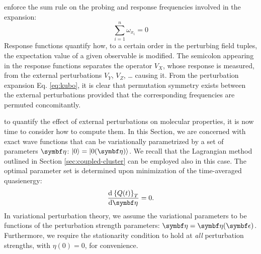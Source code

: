 enforce the sum rule on the probing and response frequencies involved in
the expansion:
\begin{equation}\label{eq:sum-rule}
 \sum_{i=1}^{n} \omega_{x_i} = 0
\end{equation}
Response functions quantify how, to a certain order in the perturbing
field tuples, the expectation value of a given observable is modified.
The semicolon appearing in the response functions separates the operator
$V_X$, whose response is measured, from the external perturbations
$V_Y$, $V_Z$, \dots{} causing it.
From the perturbation expansion Eq. \eqref{eq:kubo}, it is clear that
permutation symmetry exists between the external perturbations provided
that the corresponding frequencies are permuted concomitantly.

 to quantify the
effect of external perturbations on molecular properties, it is now time
to consider how to compute them.
In this Section, we are concerned with exact wave functions that can
be variationally parametrized by a set of parameters
$\vect{\eta}$: $\ket{0}=\ket{0(\vect{\eta})}$.
We recall that the Lagrangian method outlined in Section
\ref{sec:coupled-cluster} can be employed also in this
case.\autocite{Christiansen1998-pe, Helgaker2012-cz, Pawlowski2015-sq}
The optimal parameter set is determined upon minimization of the
time-averaged quasienergy:
\begin{equation}\label{eq:var-cond}
 \deriv{\aveQ}{\vect{\eta}} = 0.
\end{equation}
In variational perturbation theory,\autocite{Helgaker1992-ph,
Saue2002-ns} we assume the variational parameters to be functions of the
perturbation strength parameters: $\vect{\eta} =
\vect{\eta}(\vect{\epsilon})$.
Furthermore, we require the stationarity condition to hold at \emph{all}
perturbation strengths, with $\eta(0) = 0$, for convenience.

